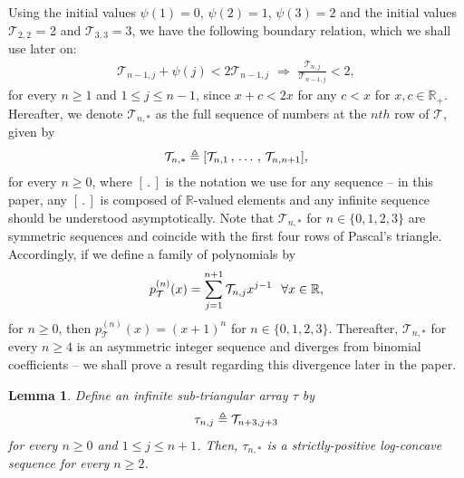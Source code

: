 \documentclass[a4paper,12pt]{article}
\newtheorem{lem}[thm]{Lemma}
\def\R{\mathbb{R}}
\def\T{\mathcal{T}}
\begin{document}
Using the initial values $\psi(1) = 0$, $\psi(2) = 1$, $\psi(3) = 2$ and the initial values $\T_{2,2}$ = 2 and $\T_{3,3} = 3$, we have the following boundary relation, which we shall use later on:
\begin{align}
\T_{n-1,j} + \psi(j) < 2\T_{n-1,j} \,\, \Rightarrow \,\, \frac{\T_{n,j}}{\T_{n-1,j}} < 2, \label{ratiorows}
\end{align}
for every $n \geq 1$ and $1 \leq j \leq n-1$, since $x + c < 2x$ for any $c < x$ for $x,c \in \R_+$. Hereafter, we denote $\T_{n,*}$ as the full sequence of numbers at the $nth$ row of $\T$, given by
\begin{align}
\T_{n,*} \triangleq [\T_{n,1}\,,\, \ldots \,,\, \T_{n,n+1}], \notag
\end{align}
for every $n\geq 0$, where $[\, . \,]$ is the notation we use for any sequence -- in this paper, any $[\, . \,]$ is composed of $\R$-valued elements and any infinite sequence should be understood asymptotically. Note that $\T_{n,*}$ for $n\in\{0,1,2,3\}$ are symmetric sequences and coincide with the first four rows of Pascal's triangle. Accordingly, if we define a family of polynomials by
\begin{align}
\label{triangularpolynomial}
p^{(n)}_{\T}(x) = \sum_{j=1}^{n+1} \T_{n,j} x^{j-1} \hspace{0.1in} \forall x \in \R, 
\end{align}
for $n\geq 0$, then $p^{(n)}_{\T}(x) = (x+1)^n$ for $n\in\{0,1,2,3\}$. Thereafter, $\T_{n,*}$ for every $n\geq 4$ is an asymmetric integer sequence and diverges from binomial coefficients -- we shall prove a result regarding this divergence later in the paper.
\begin{lem}
\label{mainlemmaone}
Define an infinite sub-triangular array $\tau$ by
\begin{align}
\tau_{n,j} \triangleq \T_{n + 3, j + 3} \notag
\end{align}
for every $n \geq 0$ and $1 \leq j \leq n +1$. Then, $\tau_{n,*}$ is a strictly-positive log-concave sequence for every $n\geq 2$.
\end{lem}
\end{document}
